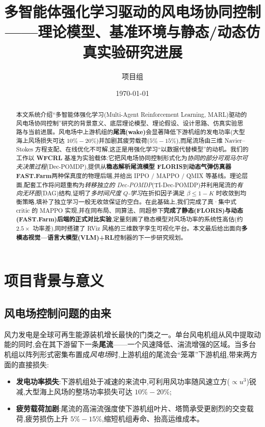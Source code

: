 \documentclass[12pt,a4paper]{article}
\title{\textbf{多智能体强化学习驱动的风电场协同控制}\\[6pt]
\large ——理论模型、基准环境与静态/动态仿真实验研究进展}
\author{项目组}
\date{\today}
\theoremstyle{definition}
\theoremstyle{plain}
\begin{document}
\maketitle

\begin{abstract}
\noindent
本文系统介绍“多智能体强化学习(Multi-Agent Reinforcement Learning, MARL)驱动的风电场协同控制”研究的背景意义、底层理论模型、理论假设、设计思路、仿真实验思路与当前进展。风电场中上游机组的\textbf{尾流(wake)}会显著降低下游机组的发电功率(大型海上风场损失可达 $10\%\!-\!20\%$)并加剧其疲劳载荷($5\%\!-\!15\%$),而尾流场由三维 Navier--Stokes 方程支配、在线优化不可解,这正是用强化学习“以数据代替模型”的动机。我们的工作以 \textbf{WFCRL} 基准\cite{wfcrl}为实验载体:它把风电场协同控制形式化为\emph{协同的部分可观马尔可夫决策过程}(Dec-POMDP),提供从\textbf{稳态解析尾流模型 FLORIS}到\textbf{动态气弹仿真器 FAST.Farm}两种保真度的物理后端,并给出 IPPO / MAPPO / QMIX 等基线。理论层面,配套工作\cite{theory}将问题重构为\emph{转移独立的 Dec-POMDP}(TI-Dec-POMDP)并利用尾流的\emph{有向无环图}(DAG)结构,证明了\emph{多时间尺度 $Q$-学习}在折扣因子满足 $\beta\le 1-K$ 时收敛到均衡策略,填补了独立学习一般无收敛保证的空白。在此基础上,我们完成了真·集中式 critic 的 MAPPO 实现,并在同布局、同算法、同超参下\textbf{完成了静态(FLORIS)与动态(FAST.Farm)后端的正式对比实验},定量刻画了稳态模型对风场功率的系统性高估(约 $2.5\times$ 功率差),同时搭建了 RViz 风格的三维数字孪生可视化平台。本文最后给出面向\textbf{多模态视觉—语言大模型(VLM)+RL}控制器的下一步研究规划。
\end{abstract}

\tableofcontents

\section{项目背景与意义}

\subsection{风电场控制问题的由来}

风力发电是全球可再生能源装机增长最快的门类之一。单台风电机组从风中提取动能的同时,会在其下游留下一条\textbf{尾流}——一个风速降低、湍流增强的区域。当多台机组以阵列形式密集布置成\emph{风电场}时,上游机组的尾流会“笼罩”下游机组,带来两方面的直接损失\cite{wfcrl}:

\begin{itemize}[leftmargin=1.5em,itemsep=1pt]
  \item \textbf{发电功率损失}:下游机组处于减速的来流中,可利用风功率随风速立方($\propto u^3$)锐减,大型海上风场的整场功率损失可达 $10\%\!-\!20\%$;
  \item \textbf{疲劳载荷加剧}:尾流的高湍流强度使下游机组叶片、塔筒承受更剧烈的交变载荷,疲劳损伤上升 $5\%\!-\!15\%$,缩短机组寿命、抬高运维成本。
\end{itemize}
\end{document}
